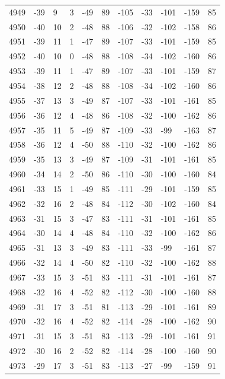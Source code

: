\begin{table}[H]
\begin{tabular}{lllllllllll}
4949 & -39 & 9 & 3 & -49 & 89 & -105 & -33 & -101 & -159 & 85 \\
4950 & -40 & 10 & 2 & -48 & 88 & -106 & -32 & -102 & -158 & 86 \\
4951 & -39 & 11 & 1 & -47 & 89 & -107 & -33 & -101 & -159 & 85 \\
4952 & -40 & 10 & 0 & -48 & 88 & -108 & -34 & -102 & -160 & 86 \\
4953 & -39 & 11 & 1 & -47 & 89 & -107 & -33 & -101 & -159 & 87 \\
4954 & -38 & 12 & 2 & -48 & 88 & -108 & -34 & -102 & -160 & 86 \\
4955 & -37 & 13 & 3 & -49 & 87 & -107 & -33 & -101 & -161 & 85 \\
4956 & -36 & 12 & 4 & -48 & 86 & -108 & -32 & -100 & -162 & 86 \\
4957 & -35 & 11 & 5 & -49 & 87 & -109 & -33 & -99 & -163 & 87 \\
4958 & -36 & 12 & 4 & -50 & 88 & -110 & -32 & -100 & -162 & 86 \\
4959 & -35 & 13 & 3 & -49 & 87 & -109 & -31 & -101 & -161 & 85 \\
4960 & -34 & 14 & 2 & -50 & 86 & -110 & -30 & -100 & -160 & 84 \\
4961 & -33 & 15 & 1 & -49 & 85 & -111 & -29 & -101 & -159 & 85 \\
4962 & -32 & 16 & 2 & -48 & 84 & -112 & -30 & -102 & -160 & 84 \\
4963 & -31 & 15 & 3 & -47 & 83 & -111 & -31 & -101 & -161 & 85 \\
4964 & -30 & 14 & 4 & -48 & 84 & -110 & -32 & -100 & -162 & 86 \\
4965 & -31 & 13 & 3 & -49 & 83 & -111 & -33 & -99 & -161 & 87 \\
4966 & -32 & 14 & 4 & -50 & 82 & -110 & -32 & -100 & -162 & 88 \\
4967 & -33 & 15 & 3 & -51 & 83 & -111 & -31 & -101 & -161 & 87 \\
4968 & -32 & 16 & 4 & -52 & 82 & -112 & -30 & -100 & -160 & 88 \\
4969 & -31 & 17 & 3 & -51 & 81 & -113 & -29 & -101 & -161 & 89 \\
4970 & -32 & 16 & 4 & -52 & 82 & -114 & -28 & -100 & -162 & 90 \\
4971 & -31 & 15 & 3 & -51 & 83 & -113 & -29 & -101 & -161 & 91 \\
4972 & -30 & 16 & 2 & -52 & 82 & -114 & -28 & -100 & -160 & 90 \\
4973 & -29 & 17 & 3 & -51 & 83 & -113 & -27 & -99 & -159 & 91 \\

\end{tabular}
\end{table}
